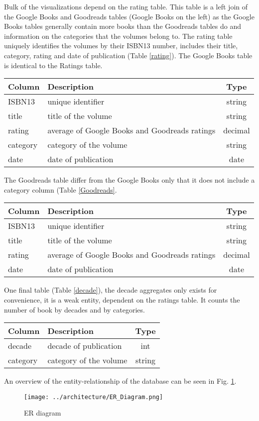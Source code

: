 \documentclass[12pt,letterpaper]{article}
\begin{document}
Bulk of the visualizations depend on the rating table. This table is a left join of the Google Books and Goodreads tables (Google Books on the left) as the Google Books tables generally contain more books than the
Goodreads tables do and information on the categories that the volumes belong to. The rating table uniquely identifies the volumes by their ISBN13 number, includes their title, category, rating and date
of publication (Table \ref{rating}). The Google Books table is identical to the Ratings table.

\begin{center}
\begin{tabular}{llc}
 Column & Description & Type \\
 \hline
 ISBN13 & unique identifier  & string \\
 title & title of the volume & string\\
 rating & average of Google Books and Goodreads ratings & decimal \\
 category & category of the volume & string \\
 date & date of publication & date\\
 \hline
\end{tabular}
\end{center}


The Goodreads table differ from the Google Books only that it does not include a category column (Table \ref{Goodreads}.

\begin{center}
\begin{tabular}{llc}
 Column & Description & Type \\
 \hline
 ISBN13 & unique identifier  & string \\
 title & title of the volume & string\\
 rating & average of Google Books and Goodreads ratings & decimal \\
 date & date of publication & date\\
 \hline
\end{tabular}
\end{center}

One final table (Table \ref{decade}), the decade aggregates only exists for convenience, it is a weak entity, dependent on the ratings table. It counts the number of book by decades and by categories.

\begin{center}
\begin{tabular}{llc}
 Column & Description & Type \\
 \hline
 decade & decade of publication  & int \\
 category & category of the volume & string\\
 \hline
\end{tabular}
\end{center}



An overview of the entity-relationship of the database can be seen in Fig. \ref{ER}.


\begin{figure}[!ht]
\texttt{[image: ../architecture/ER\_Diagram.png]}
\caption{ER diagram \label{ER}}
\end{figure}
\end{document}
